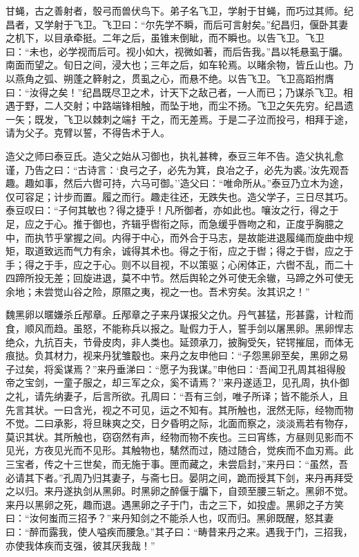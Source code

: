 \documentclass[]{article}
\begin{document}
甘蝇，古之善射者，彀弓而兽伏鸟下。弟子名飞卫，学射于甘蝇，而巧过其师。纪昌者，又学射于飞卫。飞卫曰：``尔先学不瞬，而后可言射矣。''纪昌归，偃卧其妻之机下，以目承牵挺。二年之后，虽锥末倒眦，而不瞬也。以告飞卫。飞卫曰：``未也，必学视而后可。视小如大，视微如著，而后告我。''昌以牦悬虱于牖。南面而望之。旬日之间，浸大也；三年之后，如车轮焉。以睹余物，皆丘山也。乃以燕角之弧、朔蓬之簳射之，贯虱之心，而悬不绝。以告飞卫。飞卫高蹈拊膺曰：``汝得之矣！''纪昌既尽卫之术，计天下之敌己者，一人而已；乃谋杀飞卫。相遇于野，二人交射；中路端锋相触，而坠于地，而尘不扬。飞卫之矢先穷。纪昌遗一矢；既发，飞卫以棘刺之端扌干之，而无差焉。于是二子泣而投弓，相拜于途，请为父子。克臂以誓，不得告术于人。

造父之师曰泰豆氏。造父之始从习御也，执礼甚稗，泰豆三年不告。造父执礼愈谨，乃告之曰：``古诗言：`良弓之子，必先为箕，良冶之子，必先为裘。'汝先观吾趣。趣如事，然后六辔可持，六马可御。''造父曰：``唯命所从。''泰豆乃立木为途，仅可容足；计步而置。履之而行。趣走往还，无跌失也。造父学子，三日尽其巧。泰豆叹曰：``子何其敏也？得之捷乎！凡所御者，亦如此也。嚷汝之行，得之于足，应之于心。推于御也，齐辑乎辔衔之际，而急缓乎唇吻之和，正度乎胸臆之中，而执节乎掌握之间。内得于中心，而外合于马志，是故能进退履绳而旋曲中规矩，取道致远而气力有余，诚得其术也。得之于衔，应之于辔；得之于辔，应之于手；得之于手，应之于心。则不以目视，不以策驱；心闲体正，六辔不乱，而二十四蹄所投无差；回旋进退，莫不中节。然后舆轮之外可使无余辙，马蹄之外可使无余地；未尝觉山谷之险，原隰之夷，视之一也。吾术穷矣。汝其识之！''

魏黑卵以暱嫌杀丘邴章。丘邴章之子来丹谋报父之仇。丹气甚猛，形甚露，计粒而食，顺风而趋。虽怒，不能称兵以报之。耻假力于人，誓手剑以屠黑卵。黑卵悍志绝众，九抗百夫，节骨皮肉，非人类也。延颈承刀，披胸受矢，铓锷摧屈，而体无痕挞。负其材力，视来丹犹雏鷇也。来丹之友申他曰：``子怨黑卵至矣，黑卵之易子过矣，将奚谋焉？''来丹垂涕曰：``愿子为我谋。''申他曰：`吾闻卫孔周其祖得殷帝之宝剑，一童子服之，却三军之众，奚不请焉？''来丹遂适卫，见孔周，执仆御之礼，请先纳妻子，后言所欲。孔周曰：``吾有三剑，唯子所译；皆不能杀人，且先言其状。一曰含光，视之不可见，运之不知有。其所触也，泯然无际，经物而物不觉。二曰承影，将旦昧爽之交，日夕昏明之际，北面而察之，淡淡焉若有物存，莫识其状。其所触也，窃窃然有声，经物而物不疾也。三曰宵练，方昼则见影而不见光，方夜见光而不见形。其触物也，騞然而过，随过随合，觉疾而不血刃焉。此三宝者，传之十三世矣，而无施于事。匣而藏之，未尝启封，''来丹曰：``虽然，吾必请其下者。''孔周乃归其妻子，与斋七日。晏阴之间，跪而授其下剑，来丹再拜受之以归。来丹遂执剑从黑卵。时黑卵之醉偃于牖下，自颈至腰三斩之。黑卵不觉。来丹以黑卵之死，趣而退。遇黑卵之子于门，击之三下，如投虚。黑卵之子方笑曰：``汝何蚩而三招予？''来丹知剑之不能杀人也，叹而归。黑卵既醒，怒其妻曰：``醉而露我，使人嗌疾而腰急。''其子曰：``畴昔来丹之来。遇我于门，三招我，亦使我体疾而支强，彼其厌我哉！''
\end{document}
